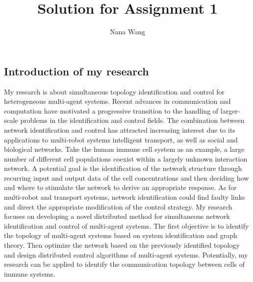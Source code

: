 \documentclass[11pt]{article}
\title{Solution for Assignment 1}
\author{Nana Wang}
\begin{document}
\maketitle

                                                                      
\subsection*{Introduction of my research}
My research is about simultaneous topology identification and control for heterogeneous multi-agent systems. Recent advances in communication and computation have motivated a progressive transition to the handling of larger-scale problems in the identification and control fields.
The combination between network identification and control has attracted increasing interest due to its applications to multi-robot systems intelligent transport, as well as social and biological networks. Take the human immune cell system as an example, a large number of different cell populations coexist within a largely unknown interaction network. A potential goal is the identification of the network structure through recurring input and output data of the cell concentrations and then deciding how and where to stimulate the network to derive an appropriate response. As for multi-robot and transport systems, network identification could find faulty links and direct the appropriate modification of the control strategy. My research focuses on developing a novel distributed method for simultaneous network identification and control of multi-agent systems. The first objective is to identify the topology of multi-agent systems based on system identification and graph theory. Then optimize the network based on the previously identified topology and design distributed control algorithms of multi-agent systems. Potentially, my research can be applied to identify the communication topology between cells of immune systems.
\\
\end{document}
